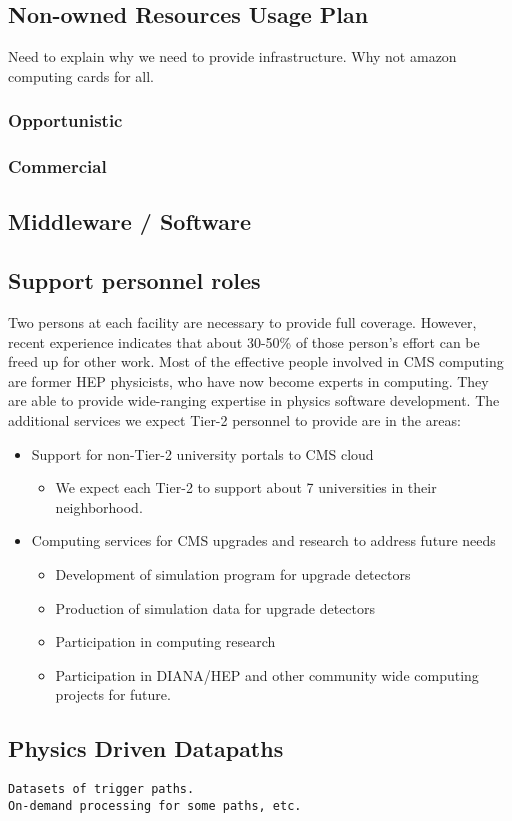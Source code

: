 \subsection{Non-owned Resources Usage Plan}
Need to explain why we need to provide infrastructure.
Why not amazon computing cards for all.
\subsubsection{Opportunistic}
\subsubsection{Commercial}

\subsection{Middleware / Software}

\subsection{Support personnel roles}

Two persons at each facility are necessary to provide full coverage.  However,
recent experience indicates that about 30-50\% of those person's effort can be
freed up for other work. Most of the effective people involved in CMS computing
are former HEP physicists, who have now become experts in computing. They
are able to provide wide-ranging expertise in physics software development.
The additional services we expect Tier-2 personnel to provide are in the areas:
\begin{itemize}
\item Support for non-Tier-2 university portals to CMS cloud
\begin{itemize}
\item We expect each Tier-2 to support about 7 universities in their neighborhood.
\end{itemize}
\item Computing services for CMS upgrades and research to address future needs
\begin{itemize}
\item Development of simulation program for upgrade detectors
\item Production of simulation data for upgrade detectors
\item Participation in computing research
\item Participation in DIANA/HEP and other community wide computing projects for future.
\end{itemize}
\end{itemize} 

\subsection{Physics Driven Datapaths}
\begin{verbatim}
Datasets of trigger paths.
On-demand processing for some paths, etc.
\end{verbatim}
